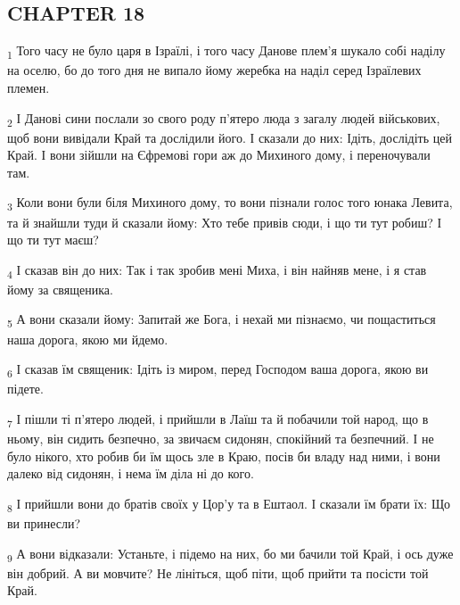 \subsection{CHAPTER 18}
\begin{tcolorbox}
\textsubscript{1} Того часу не було царя в Ізраїлі, і того часу Данове плем'я шукало собі наділу на оселю, бо до того дня не випало йому жеребка на наділ серед Ізраїлевих племен.
\end{tcolorbox}
\begin{tcolorbox}
\textsubscript{2} І Данові сини послали зо свого роду п'ятеро люда з загалу людей військових, щоб вони вивідали Край та дослідили його. І сказали до них: Ідіть, дослідіть цей Край. І вони зійшли на Єфремові гори аж до Михиного дому, і переночували там.
\end{tcolorbox}
\begin{tcolorbox}
\textsubscript{3} Коли вони були біля Михиного дому, то вони пізнали голос того юнака Левита, та й знайшли туди й сказали йому: Хто тебе привів сюди, і що ти тут робиш? І що ти тут маєш?
\end{tcolorbox}
\begin{tcolorbox}
\textsubscript{4} І сказав він до них: Так і так зробив мені Миха, і він найняв мене, і я став йому за священика.
\end{tcolorbox}
\begin{tcolorbox}
\textsubscript{5} А вони сказали йому: Запитай же Бога, і нехай ми пізнаємо, чи пощаститься наша дорога, якою ми йдемо.
\end{tcolorbox}
\begin{tcolorbox}
\textsubscript{6} І сказав їм священик: Ідіть із миром, перед Господом ваша дорога, якою ви підете.
\end{tcolorbox}
\begin{tcolorbox}
\textsubscript{7} І пішли ті п'ятеро людей, і прийшли в Лаїш та й побачили той народ, що в ньому, він сидить безпечно, за звичаєм сидонян, спокійний та безпечний. І не було нікого, хто робив би їм щось зле в Краю, посів би владу над ними, і вони далеко від сидонян, і нема їм діла ні до кого.
\end{tcolorbox}
\begin{tcolorbox}
\textsubscript{8} І прийшли вони до братів своїх у Цор'у та в Ештаол. І сказали їм брати їх: Що ви принесли?
\end{tcolorbox}
\begin{tcolorbox}
\textsubscript{9} А вони відказали: Устаньте, і підемо на них, бо ми бачили той Край, і ось дуже він добрий. А ви мовчите? Не лініться, щоб піти, щоб прийти та посісти той Край.
\end{tcolorbox}

